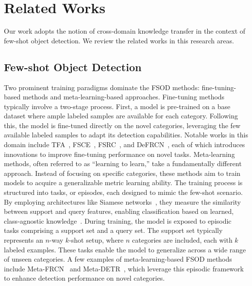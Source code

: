 \section{Related Works}
\label{Related Works}

Our work adopts the notion of cross-domain knowledge transfer in the context of few-shot object detection. We review the related works in this research areas.

\subsection{Few-shot Object Detection}
\label{sec:FSOD}

 

Two prominent training paradigms dominate the FSOD methods: fine-tuning-based methods and meta-learning-based approaches. Fine-tuning methods typically involve a two-stage process. First, a model is pre-trained on a base dataset where ample labeled samples are available for each category. Following this, the model is fine-tuned directly on the novel categories, leveraging the few available labeled samples to adapt its detection capabilities. Notable works in this domain include TFA~\cite{Wang20TFA}, FSCE~\cite{Sun21FSCE}, FSRC~\cite{Shangguan23FSRC}, and DeFRCN~\cite{Qiao21DeFRCN}, each of which introduces innovations to improve fine-tuning performance on novel tasks.
Meta-learning methods, often referred to as ``learning to learn,'' take a fundamentally different approach. Instead of focusing on specific categories, these methods aim to train models to acquire a generalizable metric learning ability. The training process is structured into tasks, or episodes, each designed to mimic the few-shot scenario. By employing architectures like Siamese networks~\cite{Koch2015SiameseNN}, they measure the similarity between support and query features, enabling classification based on learned, class-agnostic knowledge~\cite{Chen21MetaBaseline}. During training, the model is exposed to episodic tasks comprising a support set and a query set. The support set typically represents an \(n\)-way \(k\)-shot setup, where \(n\) categories are included, each with \(k\) labeled examples. These tasks enable the model to generalize across a wide range of unseen categories. 
A few examples of meta-learning-based FSOD methods include Meta-FRCN~\cite{han2022meta} and Meta-DETR~\cite{Zhang23MetaDETR}, which leverage this episodic framework to enhance detection performance on novel categories.  

